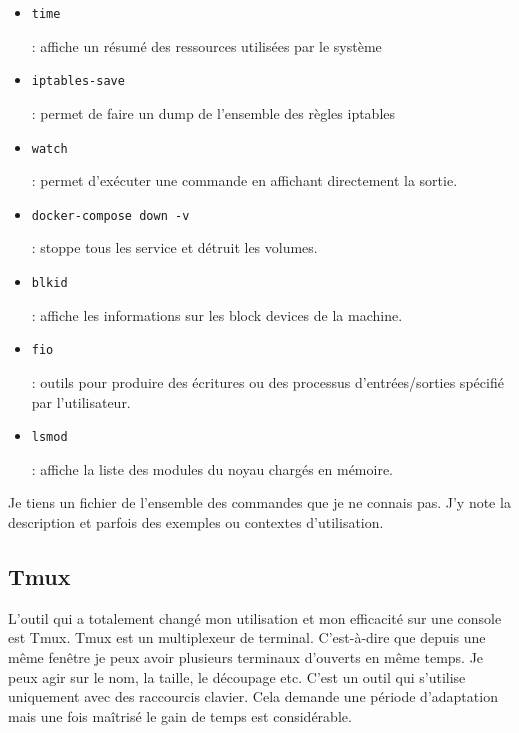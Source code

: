 \documentclass[12pt, a4paper, twoside]{article}
\begin{document}
\begin{itemize}
    \item \begin{code}\texttt{time}\end{code}: affiche un résumé des ressources utilisées par le système
    \item \begin{code}\texttt{iptables-save}\end{code}: permet de faire un dump de l'ensemble des règles iptables
    \item \begin{code}\texttt{watch}\end{code}: permet d'exécuter une commande en affichant directement la sortie.
    \item \begin{code}\texttt{docker-compose down -v}\end{code}: stoppe tous les service et détruit les volumes.
    \item \begin{code}\texttt{blkid}\end{code}: affiche les informations sur les block devices de la machine.
    \item \begin{code}\texttt{fio}\end{code}: outils pour produire des écritures ou des processus d'entrées/sorties spécifié par l'utilisateur.
    \item \begin{code}\texttt{lsmod}\end{code}: affiche la liste des modules du noyau chargés en mémoire. 

\end{itemize}

Je tiens un fichier de l'ensemble des commandes que je ne connais pas.
J'y note la description et parfois des exemples ou contextes d'utilisation.

\subsection{Tmux}
L'outil qui a totalement changé mon utilisation et mon efficacité sur une console est Tmux.
Tmux est un multiplexeur de terminal.
C'est-à-dire que depuis une même fenêtre je peux avoir plusieurs terminaux d'ouverts en même temps.
Je peux agir sur le nom, la taille, le découpage etc.
C'est un outil qui s'utilise uniquement avec des raccourcis clavier.
Cela demande une période d'adaptation mais une fois maîtrisé le gain de temps est considérable.
\end{document}
